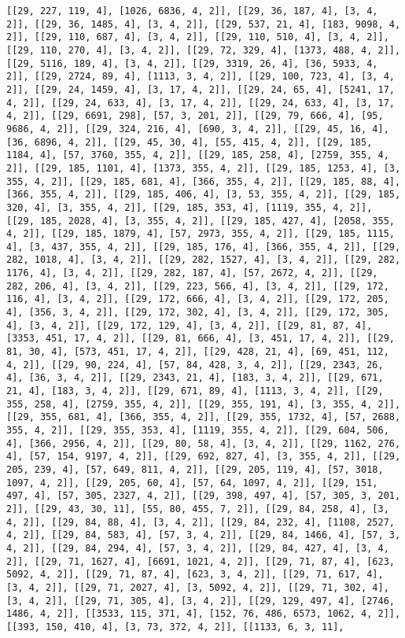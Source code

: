 \documentclass[12pt,fleqn]{article}\usepackage{../../common}
\begin{document}
\begin{verbatim}
[[29, 227, 119, 4], [1026, 6836, 4, 2]], [[29, 36, 187, 4], [3, 4, 2]], [[29, 36, 1485, 4], [3, 4, 2]], [[29, 537, 21, 4], [183, 9098, 4, 2]], [[29, 110, 687, 4], [3, 4, 2]], [[29, 110, 510, 4], [3, 4, 2]], [[29, 110, 270, 4], [3, 4, 2]], [[29, 72, 329, 4], [1373, 488, 4, 2]], [[29, 5116, 189, 4], [3, 4, 2]], [[29, 3319, 26, 4], [36, 5933, 4, 2]], [[29, 2724, 89, 4], [1113, 3, 4, 2]], [[29, 100, 723, 4], [3, 4, 2]], [[29, 24, 1459, 4], [3, 17, 4, 2]], [[29, 24, 65, 4], [5241, 17, 4, 2]], [[29, 24, 633, 4], [3, 17, 4, 2]], [[29, 24, 633, 4], [3, 17, 4, 2]], [[29, 6691, 298], [57, 3, 201, 2]], [[29, 79, 666, 4], [95, 9686, 4, 2]], [[29, 324, 216, 4], [690, 3, 4, 2]], [[29, 45, 16, 4], [36, 6896, 4, 2]], [[29, 45, 30, 4], [55, 415, 4, 2]], [[29, 185, 1184, 4], [57, 3760, 355, 4, 2]], [[29, 185, 258, 4], [2759, 355, 4, 2]], [[29, 185, 1101, 4], [1373, 355, 4, 2]], [[29, 185, 1253, 4], [3, 355, 4, 2]], [[29, 185, 681, 4], [366, 355, 4, 2]], [[29, 185, 88, 4], [366, 355, 4, 2]], [[29, 185, 406, 4], [3, 53, 355, 4, 2]], [[29, 185, 320, 4], [3, 355, 4, 2]], [[29, 185, 353, 4], [1119, 355, 4, 2]], [[29, 185, 2028, 4], [3, 355, 4, 2]], [[29, 185, 427, 4], [2058, 355, 4, 2]], [[29, 185, 1879, 4], [57, 2973, 355, 4, 2]], [[29, 185, 1115, 4], [3, 437, 355, 4, 2]], [[29, 185, 176, 4], [366, 355, 4, 2]], [[29, 282, 1018, 4], [3, 4, 2]], [[29, 282, 1527, 4], [3, 4, 2]], [[29, 282, 1176, 4], [3, 4, 2]], [[29, 282, 187, 4], [57, 2672, 4, 2]], [[29, 282, 206, 4], [3, 4, 2]], [[29, 223, 566, 4], [3, 4, 2]], [[29, 172, 116, 4], [3, 4, 2]], [[29, 172, 666, 4], [3, 4, 2]], [[29, 172, 205, 4], [356, 3, 4, 2]], [[29, 172, 302, 4], [3, 4, 2]], [[29, 172, 305, 4], [3, 4, 2]], [[29, 172, 129, 4], [3, 4, 2]], [[29, 81, 87, 4], [3353, 451, 17, 4, 2]], [[29, 81, 666, 4], [3, 451, 17, 4, 2]], [[29, 81, 30, 4], [573, 451, 17, 4, 2]], [[29, 428, 21, 4], [69, 451, 112, 4, 2]], [[29, 90, 224, 4], [57, 84, 428, 3, 4, 2]], [[29, 2343, 26, 4], [36, 3, 4, 2]], [[29, 2343, 21, 4], [183, 3, 4, 2]], [[29, 671, 21, 4], [183, 3, 4, 2]], [[29, 671, 89, 4], [1113, 3, 4, 2]], [[29, 355, 258, 4], [2759, 355, 4, 2]], [[29, 355, 191, 4], [3, 355, 4, 2]], [[29, 355, 681, 4], [366, 355, 4, 2]], [[29, 355, 1732, 4], [57, 2688, 355, 4, 2]], [[29, 355, 353, 4], [1119, 355, 4, 2]], [[29, 604, 506, 4], [366, 2956, 4, 2]], [[29, 80, 58, 4], [3, 4, 2]], [[29, 1162, 276, 4], [57, 154, 9197, 4, 2]], [[29, 692, 827, 4], [3, 355, 4, 2]], [[29, 205, 239, 4], [57, 649, 811, 4, 2]], [[29, 205, 119, 4], [57, 3018, 1097, 4, 2]], [[29, 205, 60, 4], [57, 64, 1097, 4, 2]], [[29, 151, 497, 4], [57, 305, 2327, 4, 2]], [[29, 398, 497, 4], [57, 305, 3, 201, 2]], [[29, 43, 30, 11], [55, 80, 455, 7, 2]], [[29, 84, 258, 4], [3, 4, 2]], [[29, 84, 88, 4], [3, 4, 2]], [[29, 84, 232, 4], [1108, 2527, 4, 2]], [[29, 84, 583, 4], [57, 3, 4, 2]], [[29, 84, 1466, 4], [57, 3, 4, 2]], [[29, 84, 294, 4], [57, 3, 4, 2]], [[29, 84, 427, 4], [3, 4, 2]], [[29, 71, 1627, 4], [6691, 1021, 4, 2]], [[29, 71, 87, 4], [623, 5092, 4, 2]], [[29, 71, 87, 4], [623, 3, 4, 2]], [[29, 71, 617, 4], [3, 4, 2]], [[29, 71, 2027, 4], [3, 5092, 4, 2]], [[29, 71, 302, 4], [3, 4, 2]], [[29, 71, 305, 4], [3, 4, 2]], [[29, 129, 497, 4], [2746, 1486, 4, 2]], [[3533, 115, 371, 4], [152, 76, 486, 6573, 1062, 4, 2]], [[393, 150, 410, 4], [3, 73, 372, 4, 2]], [[1133, 6, 3, 11], 
\end{verbatim}
\end{document}
